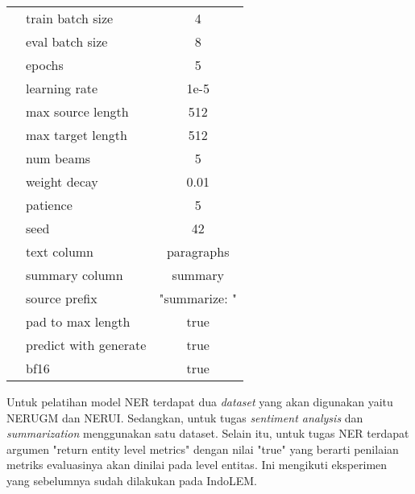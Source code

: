 \begin{table}[h]
\begin{tabular}{|c|l|c|}
                                                & train batch size & 4 \\ \cline{2-3}
                                                & eval batch size & 8 \\ \cline{2-3}
                                                & epochs & 5 \\ \cline{2-3}
                                                & learning rate & 1e-5 \\ \cline{2-3}
                                                & max source length & 512 \\ \cline{2-3}
                                                & max target length & 512 \\ \cline{2-3}
                                                & num beams & 5 \\ \cline{2-3}
                                                & weight decay & 0.01 \\ \cline{2-3}
                                                & patience & 5 \\ \cline{2-3}
                                                & seed & 42 \\ \cline{2-3}
                                                & text column & paragraphs \\ \cline{2-3}
                                                & summary column & summary \\ \cline{2-3}
                                                & source prefix & "summarize: " \\ \cline{2-3}
                                                & pad to max length & true \\ \cline{2-3}
                                                & predict with generate & true \\ \cline{2-3}
                                                & bf16 & true \\ \hline
    \end{tabular}
\end{table}

Untuk pelatihan model NER terdapat dua \textit{dataset} yang akan digunakan yaitu NERUGM dan NERUI. Sedangkan, untuk tugas \textit{sentiment analysis} dan \textit{summarization} menggunakan satu dataset. Selain itu, untuk tugas NER terdapat argumen "return entity level metrics" dengan nilai "true" yang berarti penilaian metriks evaluasinya akan dinilai pada level entitas. Ini mengikuti eksperimen yang sebelumnya sudah dilakukan pada IndoLEM.

